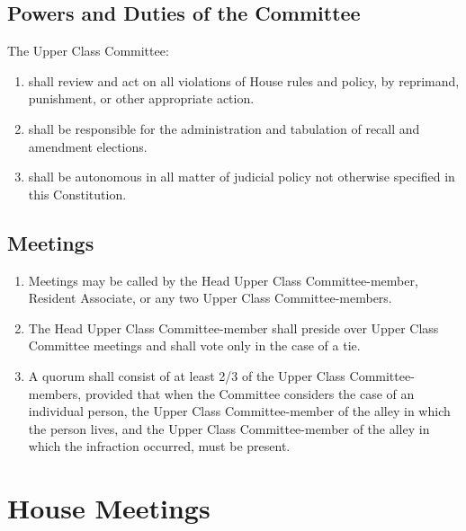 \documentclass[10pt]{article} %
\begin{document}
\subsection{Powers and Duties of the Committee}
The Upper Class Committee:
\begin{enumerate}
\item shall review and act on all violations of House rules and policy, by reprimand, punishment, or other appropriate action.
\item shall be responsible for the administration and tabulation of recall and amendment elections.
\item shall be autonomous in all matter of judicial policy not otherwise specified in this Constitution.
\end{enumerate}
\subsection{Meetings}
\begin{enumerate}
\item Meetings may be called by the Head Upper Class Committee-member, Resident Associate, or any two Upper Class Committee-members.
\item The Head Upper Class Committee-member shall preside over Upper Class Committee meetings and shall vote only in the case of a tie.
\item A quorum shall consist of at least 2/3 of the Upper Class Committee-members, provided that when the Committee considers the case of an individual person, the Upper Class Committee-member of the alley in which the person lives, and the Upper Class Committee-member of the alley in which the infraction occurred, must be present.
\end{enumerate}
\section{House Meetings}
\end{document}
